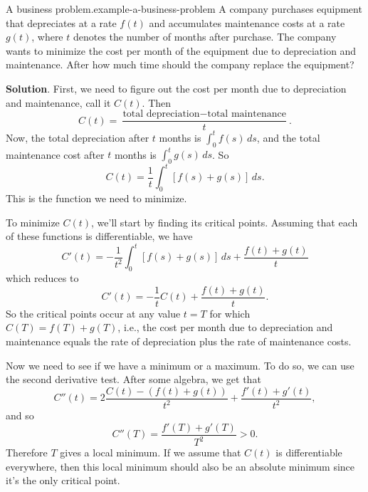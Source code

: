 \documentclass[10pt,]{book}
\numberwithin{equation}{section}
\begin{document}
\begin{example}{A business problem.}{example-a-business-problem}%
\hypertarget{p-473}{}%
A company purchases equipment that depreciates at a rate \(f(t)\) and accumulates maintenance costs at a rate \(g(t)\), where \(t\) denotes the number of months after purchase. The company wants to minimize the cost per month of the equipment due to depreciation and maintenance. After how much time should the company replace the equipment?%
\par\smallskip%
\noindent\textbf{Solution}.\hypertarget{solution-104}{}\quad%
\hypertarget{p-474}{}%
First, we need to figure out the cost per month due to depreciation and maintenance, call it \(C(t)\). Then%
\begin{equation*}
C(t) = \frac{\text{total depreciation} - \text{total maintenance}}{t}.
\end{equation*}
Now, the total depreciation after \(t\) months is \(\int_{0}^{t}f(s)\,ds\), and the total maintenance cost after \(t\) months is \(\int_{0}^{t}g(s)\,ds\). So%
\begin{equation*}
C(t) = \frac{1}{t}\int_{0}^{t}[f(s) + g(s)]\,ds.
\end{equation*}
This is the function we need to minimize.%
\par
\hypertarget{p-475}{}%
To minimize \(C(t)\), we'll start by finding its critical points. Assuming that each of these functions is differentiable, we have%
\begin{equation*}
C'(t) = -\frac{1}{t^{2}}\int_{0}^{t}[f(s)+g(s)]\,ds + \frac{f(t) + g(t)}{t}
\end{equation*}
which reduces to%
\begin{equation*}
C'(t) = -\frac{1}{t}C(t) + \frac{f(t) + g(t)}{t}.
\end{equation*}
So the critical points occur at any value \(t = T\) for which \(C(T) = f(T) + g(T)\), i.e., the cost per month due to depreciation and maintenance equals the rate of depreciation plus the rate of maintenance costs.%
\par
\hypertarget{p-476}{}%
Now we need to see if we have a minimum or a maximum. To do so, we can use the second derivative test. After some algebra, we get that%
\begin{equation*}
C''(t) = 2\frac{C(t) - (f(t) + g(t))}{t^{2}} + \frac{f'(t) + g'(t)}{t^{2}},
\end{equation*}
and so%
\begin{equation*}
C''(T) = \frac{f'(T) + g'(T)}{T^{2}} >0.
\end{equation*}
Therefore \(T\) gives a local minimum. If we assume that \(C(t)\) is differentiable everywhere, then this local minimum should also be an absolute minimum since it's the only critical point.%
\end{example}
%
%
\typeout{************************************************}
\typeout{************************************************}
%
\end{document}

